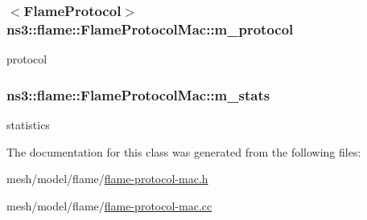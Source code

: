 \subsubsection[{\texorpdfstring{m\+\_\+protocol}{m_protocol}}]{$<${\bf Flame\+Protocol}$>$ ns3\+::flame\+::\+Flame\+Protocol\+Mac\+::m\+\_\+protocol\hspace{0.3cm}{\ttfamily [private]}}\hypertarget{classns3_1_1flame_1_1FlameProtocolMac_a87408b4232aafa9c0ea8a9951d50b39b}{}\label{classns3_1_1flame_1_1FlameProtocolMac_a87408b4232aafa9c0ea8a9951d50b39b}


protocol 

\subsubsection[{\texorpdfstring{m\+\_\+stats}{m_stats}}]{ ns3\+::flame\+::\+Flame\+Protocol\+Mac\+::m\+\_\+stats\hspace{0.3cm}{\ttfamily [private]}}\hypertarget{classns3_1_1flame_1_1FlameProtocolMac_a57bb890f13b6f1733587ce706368c037}{}\label{classns3_1_1flame_1_1FlameProtocolMac_a57bb890f13b6f1733587ce706368c037}


statistics 



The documentation for this class was generated from the following files\+:\begin{DoxyCompactItemize}
\item 
mesh/model/flame/\hyperlink{flame-protocol-mac_8h}{flame-\/protocol-\/mac.\+h}\item 
mesh/model/flame/\hyperlink{flame-protocol-mac_8cc}{flame-\/protocol-\/mac.\+cc}\end{DoxyCompactItemize}
